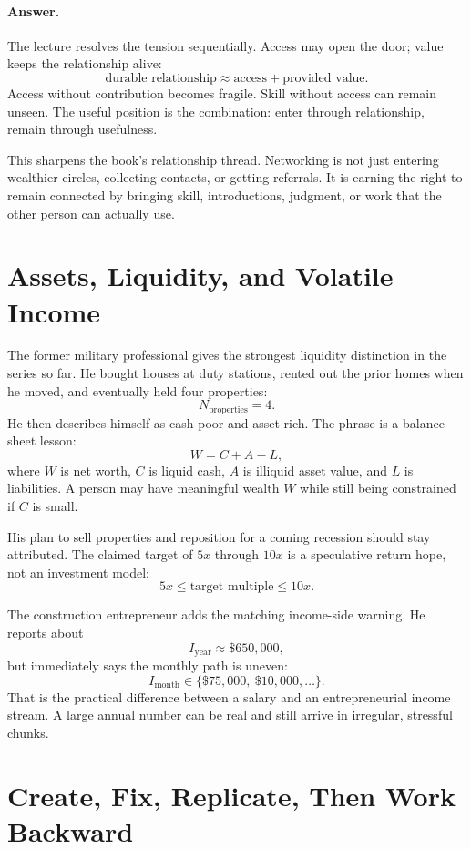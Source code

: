 \documentclass[11pt,oneside]{book}
\begin{document}
\paragraph{Answer.}
The lecture resolves the tension sequentially. Access may open the door; value keeps the relationship alive:
\[
\text{durable relationship}
\approx
\text{access}
+
\text{provided value}.
\]
Access without contribution becomes fragile. Skill without access can remain unseen. The useful position is the combination: enter through relationship, remain through usefulness.

This sharpens the book's relationship thread. Networking is not just entering wealthier circles, collecting contacts, or getting referrals. It is earning the right to remain connected by bringing skill, introductions, judgment, or work that the other person can actually use.

\section{Assets, Liquidity, and Volatile Income}

The former military professional gives the strongest liquidity distinction in the series so far. He bought houses at duty stations, rented out the prior homes when he moved, and eventually held four properties:
\[
N_{\mathrm{properties}}=4.
\]
He then describes himself as cash poor and asset rich. The phrase is a balance-sheet lesson:
\[
W=C+A-L,
\]
where \(W\) is net worth, \(C\) is liquid cash, \(A\) is illiquid asset value, and \(L\) is liabilities. A person may have meaningful wealth \(W\) while still being constrained if \(C\) is small.

His plan to sell properties and reposition for a coming recession should stay attributed. The claimed target of \(5x\) through \(10x\) is a speculative return hope, not an investment model:
\[
5x \leq \text{target multiple} \leq 10x.
\]

The construction entrepreneur adds the matching income-side warning. He reports about
\[
I_{\mathrm{year}}\approx \$650{,}000,
\]
but immediately says the monthly path is uneven:
\[
I_{\mathrm{month}}\in\{\$75{,}000,\ \$10{,}000,\ldots\}.
\]
That is the practical difference between a salary and an entrepreneurial income stream. A large annual number can be real and still arrive in irregular, stressful chunks.

\section{Create, Fix, Replicate, Then Work Backward}
\end{document}
